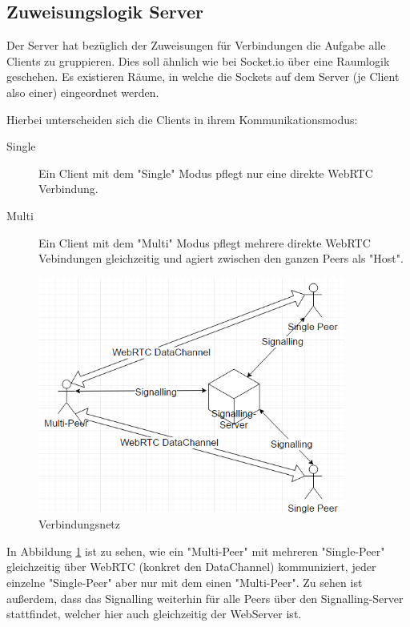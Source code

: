 \subsection{Zuweisungslogik Server}
Der Server hat bezüglich der Zuweisungen für Verbindungen die Aufgabe alle 
Clients zu gruppieren. Dies soll ähnlich wie bei Socket.io über eine Raumlogik 
geschehen. Es existieren Räume, in welche die Sockets auf dem Server (je Client 
also einer) eingeordnet werden.


Hierbei unterscheiden sich die Clients in ihrem Kommunikationsmodus:
\begin{description}
\item[Single]
Ein Client mit dem "Single" Modus pflegt nur eine direkte WebRTC Verbindung.

\item[Multi]
Ein Client mit dem "Multi" Modus pflegt mehrere direkte WebRTC Vebindungen 
gleichzeitig und agiert zwischen den ganzen Peers als "Host".
\end{description}

\begin{figure}[htH]
\centering
\includegraphics[width=0.9\textwidth]{backend/ConnectionBetweenPeers.PNG}
\caption{Verbindungsnetz}
\label{backfig1}
\end{figure}

In Abbildung \ref{backfig1} ist zu sehen, wie ein "Multi-Peer" mit mehreren 
"Single-Peer" gleichzeitig über WebRTC (konkret den DataChannel) kommuniziert, 
jeder einzelne "Single-Peer" aber nur mit dem einen "Multi-Peer". Zu sehen ist 
außerdem, dass das Signalling weiterhin für alle Peers über den 
Signalling-Server stattfindet, welcher hier auch gleichzeitig der WebServer ist.



